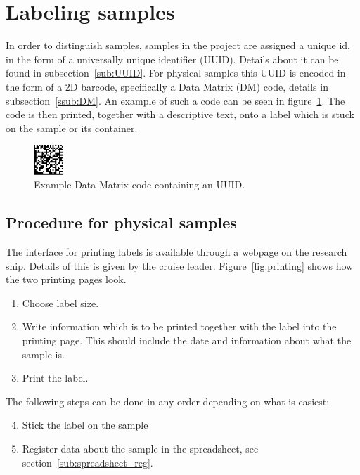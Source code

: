 \documentclass[a4paper,english, 11pt]{article}
\begin{document}
\section{Labeling samples} %
\label{sec:Labeling samples}



In order to distinguish samples, samples in the project are assigned a unique id, in the form of a universally unique identifier (UUID). Details about it can be found in subsection~\ref{sub:UUID}. For physical samples this UUID is encoded in the form of a 2D barcode, specifically a Data Matrix (DM) code, details in subsection~\ref{ssub:DM}. An example of such a code can be seen in figure~\ref{fig:data_matrix}. The code is then printed, together with a descriptive text, onto a label which is stuck on the sample or its container.

\begin{figure}[htb]
    \centering
    \includegraphics[width=0.1\textwidth]{Data_matrix.png}
    \caption{\label{fig:data_matrix}
        Example Data Matrix code containing an UUID.
    }

\end{figure}

\subsection{Procedure for physical samples} %
\label{sub:Procedure for physical samples}


The interface for printing labels is available through a webpage on the research ship. Details of this is given by the cruise leader. Figure~\ref{fig:printing} shows how the two printing pages look.

\begin{enumerate}
    \item Choose label size.
    \item Write information which is to be printed together with the label into the printing page. This should include the date and information about what the sample is.
    \item Print the label.  
\end{enumerate}
The following steps can be done in any order depending on what is easiest:
\begin{enumerate}
\setcounter{enumi}{3}
    \item Stick the label on the sample
    \item Register data about the sample in the spreadsheet, see section~\ref{sub:spreadsheet_reg}.
\end{enumerate}
\end{document}
